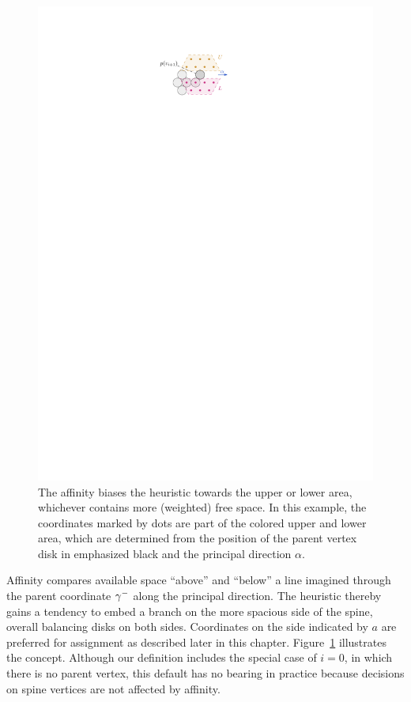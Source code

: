 \begin{figure}
    \centering
    \includegraphics{graphics/ch5_affinity.pdf}
    \caption{The affinity biases the heuristic towards the upper or lower area, whichever contains more (weighted) free space. In this example, the coordinates marked by dots are part of the colored upper and lower area, which are determined from the position of the parent vertex disk in emphasized black and the principal direction $\alpha$.}
    \label{fig:ch5-affinity}
\end{figure}

Affinity compares available space ``above'' and ``below'' a line imagined through the parent coordinate $\gamma^-$ along the principal direction. The heuristic thereby gains a tendency to embed a branch on the more spacious side of the spine, overall balancing disks on both sides. Coordinates on the side indicated by $a$ are preferred for assignment as described later in this chapter. Figure~\ref{fig:ch5-affinity} illustrates the concept.
 Although our definition includes the special case of $i=0$, in which there is no parent vertex, this default has no bearing in practice because decisions on spine vertices are not affected by affinity.


